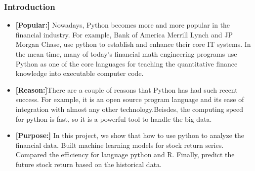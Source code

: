 \documentclass{beamer}
\begin{document}
\begin{frame}
\frametitle{Introduction}
\begin{itemize}
\item \textbf{[Popular:]} Nowadays, Python becomes more and more popular in the financial
industry. For example, Bank of America Merrill Lynch and JP Morgan
Chase, use python to establish and enhance their core IT systems. In
the mean time, many of today's financial math engineering programs
use Python as one of the core languages for teaching the quantitative
finance knowledge into executable computer code.
\item  \textbf{[Reason:]}There are a couple of reasons that Python has had such recent
success. For example, it is an open source program language and its
ease of integration with almost any other technology.Beisdes, the computing speed for python is fast, so it is a powerful tool to handle the big data.
\item \textbf{[Purpose:]} In this project, we show that how to use python to analyze the financial data. Built machine learning models for stock return series. Compared the efficiency for language python and R. Finally, predict the future stock return based on the historical data.\\
\end{itemize}


\end{frame}
\end{document}
